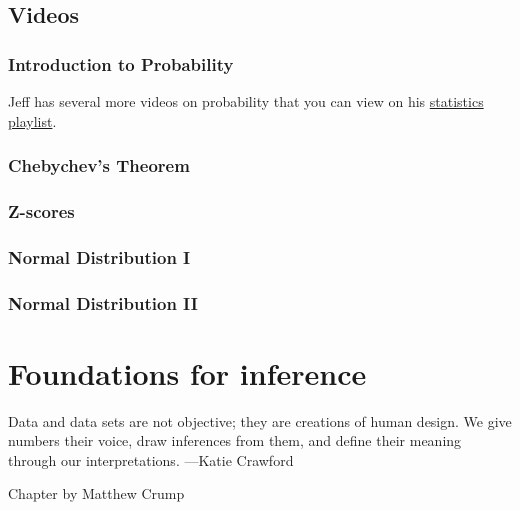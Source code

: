\documentclass[
]{book}
\begin{document}
\hypertarget{videos}{%
\section{Videos}\label{videos}}

\hypertarget{introduction-to-probability}{%
\subsection{Introduction to Probability}\label{introduction-to-probability}}

Jeff has several more videos on probability that you can view on his \href{https://www.youtube.com/playlist?list=PLKXdxQAT3tCvuex_E1ZnQYaw897ELUSaI}{statistics playlist}.

\hypertarget{chebychevs-theorem}{%
\subsection{Chebychev's Theorem}\label{chebychevs-theorem}}

\hypertarget{z-scores-1}{%
\subsection{Z-scores}\label{z-scores-1}}

\hypertarget{normal-distribution-i}{%
\subsection{Normal Distribution I}\label{normal-distribution-i}}

\hypertarget{normal-distribution-ii}{%
\subsection{Normal Distribution II}\label{normal-distribution-ii}}

\hypertarget{foundations-for-inference}{%
\chapter{Foundations for inference}\label{foundations-for-inference}}

{
Data and data sets are not objective; they are creations of human design. We give numbers their voice, draw inferences from them, and define their meaning through our interpretations.
---Katie Crawford
}

\begin{marginnote}

Chapter by Matthew Crump

\end{marginnote}
\end{document}
